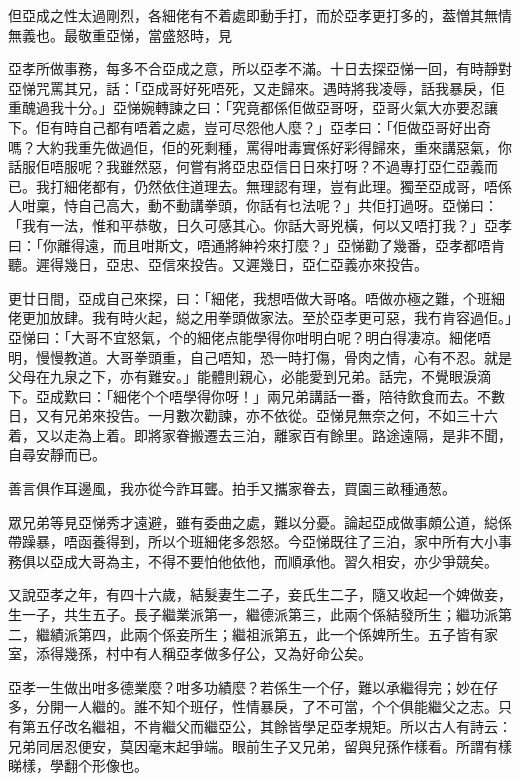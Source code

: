 \documentclass[a5paper, 12pt, openany]{book} %
\begin{document}
	但亞成之性太過剛烈，各細佬有不着處即動手打，而於亞孝更打多的，葢憎其無情無義也。最敬重亞悌，當盛怒時，見

	亞孝所做事務，每多不合亞成之意，所以亞孝不滿。十日去探亞悌一回，有時靜對亞悌咒罵其兄，話：「亞成哥好死唔死，又走歸來。遇時將我凌辱，話我暴戾，佢重醜過我十分。」亞悌婉轉諫之曰：「究竟都係佢做亞哥呀，亞哥火氣大亦要忍讓下。佢有時自己都有唔着之處，豈可尽怨他人麼？」亞孝曰：「佢做亞哥好出奇嗎？大約我重先做過佢，佢的死剩種，罵得咁毒實係好彩得歸來，重來講惡氣，你話服佢唔服呢？我雖然惡，何嘗有將亞忠亞信日日來打呀？不過專打亞仁亞義而已。我打細佬都有，仍然依住道理去。無理認有理，豈有此理。獨至亞成哥，唔係人咁稟，恃自己高大，動不動講拳頭，你話有乜法呢？」共佢打過呀。亞悌曰：「我有一法，惟和平恭敬，日久可感其心。你話大哥兇橫，何以又唔打我？」亞孝曰：「你離得遠，而且咁斯文，唔通將紳衿來打麼？」亞悌勸了幾番，亞孝都唔肯聽。遲得幾日，亞忠、亞信來投告。又遲幾日，亞仁亞義亦來投告。

	更廿日間，亞成自己來探，曰：「細佬，我想唔做大哥咯。唔做亦極之難，个班細佬更加放肆。我有時火起，縂之用拳頭做家法。至於亞孝更可惡，我冇肯容過佢。」亞悌曰：「大哥不宜怒氣，个的細佬点能學得你咁明白呢？明白得凄凉。細佬唔明，慢慢教道。大哥拳頭重，自己唔知，恐一時打傷，骨肉之情，心有不忍。就是父母在九泉之下，亦有難安。」能體則親心，必能愛到兄弟。話完，不覺眼淚滴下。亞成歎曰：「細佬个个唔學得你呀！」兩兄弟講話一番，陪待飲食而去。不數日，又有兄弟來投告。一月數次勸諫，亦不依從。亞悌見無奈之何，不如三十六着，又以走為上着。即將家眷搬遷去三泊，離家百有餘里。路途遠隔，是非不聞，自尋安靜而已。

	善言俱作耳邊風，我亦從今詐耳聾。拍手又攜家眷去，買園三畝種通葱。

	眾兄弟等見亞悌秀才遠避，雖有委曲之處，難以分憂。論起亞成做事頗公道，縂係帶躁暴，唔函養得到，所以个班細佬多怨怒。今亞悌既往了三泊，家中所有大小事務俱以亞成大哥為主，不得不要怕他依他，而順承他。習久相安，亦少爭競矣。

	又說亞孝之年，有四十六歲，結髮妻生二子，妾氏生二子，隨又收起一个婢做妾，生一子，共生五子。長子繼業派第一，繼德派第三，此兩个係結發所生；繼功派第二，繼績派第四，此兩个係妾所生；繼祖派第五，此一个係婢所生。五子皆有家室，添得幾孫，村中有人稱亞孝做多仔公，又為好命公矣。

	亞孝一生做出咁多德業麼？咁多功績麼？若係生一个仔，難以承繼得完；妙在仔多，分開一人繼的。誰不知个班仔，性情暴戾，了不可當，个个俱能繼父之志。只有第五仔改名繼祖，不肯繼父而繼亞公，其餘皆學足亞孝規矩。所以古人有詩云：兄弟同居忍便安，莫因毫末起爭端。眼前生子又兄弟，留與兒孫作樣看。所謂有樣睇樣，學翻个形像也。
\end{document}
